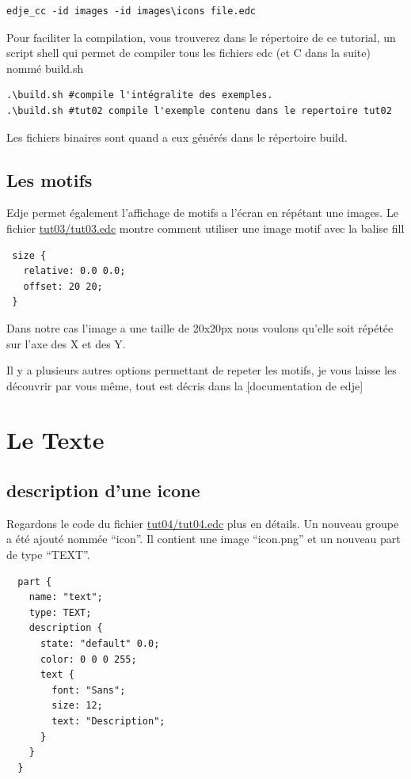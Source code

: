 \documentclass[a4paper]{efr}
\begin{document}
\begin{lstlisting}
edje_cc -id images -id images\icons file.edc
\end{lstlisting}

Pour faciliter la compilation, vous trouverez dans le répertoire de ce tutorial,
un script shell qui permet de compiler tous les fichiers edc (et C dans la
suite) nommé build.sh

\begin{lstlisting}
.\build.sh #compile l'intégralite des exemples.
.\build.sh #tut02 compile l'exemple contenu dans le repertoire tut02
\end{lstlisting}

Les fichiers binaires sont quand a eux générés dans le répertoire build.

\subsection{Les motifs}
Edje permet également l'affichage de motifs a l'écran en répétant une images.
Le fichier \href{file://tut03/tut03.edc}{tut03/tut03.edc} montre comment
utiliser une image motif avec la balise fill
\begin{lstlisting}
 size {
   relative: 0.0 0.0;
   offset: 20 20;
 }
\end{lstlisting}

Dans notre cas l'image a une taille de 20x20px nous voulons qu'elle soit répétée
sur l'axe des X et des Y.

Il y a plusieurs autres options permettant de repeter les motifs, je vous laisse
les découvrir par vous même, tout est décris dans la
\href{http://docs.enlightenment.org/auto/edje/edcref.html}[documentation de edje]


\section{Le Texte}
\subsection{description d'une icone}
Regardons le code du fichier \href{file://tut04/tut04.edc}{tut04/tut04.edc} plus
en détails. Un nouveau groupe a été ajouté nommée ``icon''. Il contient une
image ``icon.png'' et un nouveau part de type ``TEXT''.

\begin{lstlisting}
  part {
    name: "text";
    type: TEXT;
    description {
      state: "default" 0.0;
      color: 0 0 0 255;
      text {
        font: "Sans";
        size: 12;
        text: "Description";
      }
    }
  }
\end{lstlisting}
\end{document}
